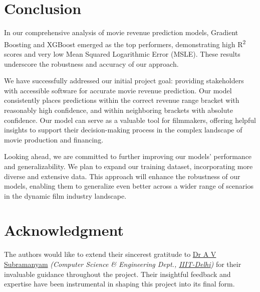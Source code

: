 \documentclass[conference]{IEEEtran}
\begin{document}
\section{Conclusion}
    In our comprehensive analysis of movie revenue prediction models, Gradient Boosting and XGBoost emerged as the top performers, demonstrating high R\textsuperscript{2} scores and very low Mean Squared Logarithmic Error (MSLE). These results underscore the robustness and accuracy of our approach.

    
    We have successfully addressed our initial project goal: providing stakeholders with accessible software for accurate movie revenue prediction. Our model consistently places predictions within the correct revenue range bracket with reasonably high confidence, and within neighboring brackets with absolute confidence. Our model can serve as a valuable tool for filmmakers, offering helpful insights to support their decision-making process in the complex landscape of movie production and financing.

    
    Looking ahead, we are committed to further improving our models' performance and generalizability. We plan to expand our training dataset, incorporating more diverse and extensive data. This approach will enhance the robustness of our models, enabling them to generalize even better across a wider range of scenarios in the dynamic film industry landscape.

\section*{Acknowledgment}
    The authors would like to extend their sincerest gratitude to \href{https://www.iiitd.ac.in/subramanyam}{Dr A V Subramanyam} \textit{(Computer Science \& Engineering Dept., \href{https://www.iiitd.ac.in/}{IIIT-Delhi})} for their invaluable guidance throughout the project.
    Their insightful feedback and expertise have been instrumental in shaping this project into its final form.
\end{document}
